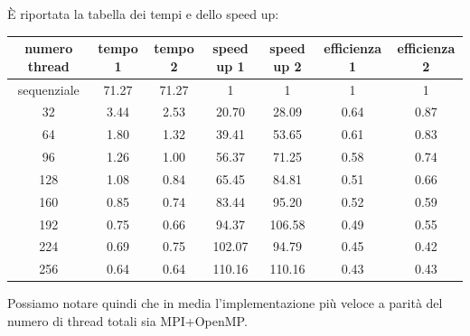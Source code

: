 \documentclass[12pt,openany]{report}
\begin{document}
È riportata la tabella dei tempi e dello speed up:
\begin{center}
    \begin{tabular}{|c|c|c|c|c|c|c|}
        \hline
        \rowcolor[HTML]{EFEFEF} 
        numero thread & tempo 1 & tempo 2 & speed up 1 & speed up 2 & efficienza 1 & efficienza 2\\ \hline
        sequenziale          & 71.27      & 71.27                              & 1                 & 1       & 1 &1          \\ \hline
        32                   & 3.44       & 2.53                               & 20.70         & 28.09   & 0.64&0.87      \\ \hline
        64                   & 1.80       & 1.32                              & 39.41         & 53.65    &0.61&0.83      \\ \hline
        96                   & 1.26       & 1.00                              & 56.37         & 71.25    & 0.58&0.74     \\ \hline
        128                  & 1.08       & 0.84                               & 65.45         & 84.81   &0.51&0.66      \\ \hline
        160                  & 0.85       & 0.74                               & 83.44         & 95.20   &0.52&0.59      \\ \hline
        192                  & 0.75       & 0.66                               & 94.37         & 106.58  &0.49&0.55      \\ \hline
        224                  & 0.69       & 0.75                               & 102.07        & 94.79   &0.45&0.42      \\ \hline
        256                  & 0.64       & 0.64                            & 110.16        & 110.16     &0.43&0.43   \\ \hline
        \end{tabular}
\end{center}

Possiamo notare quindi che in media l'implementazione più veloce a parità del numero di thread totali sia MPI+OpenMP.
\end{document}
